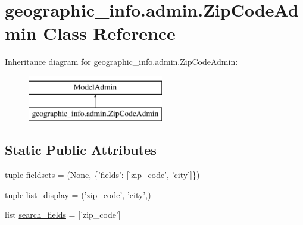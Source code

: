 \hypertarget{classgeographic__info_1_1admin_1_1_zip_code_admin}{\section{geographic\-\_\-info.\-admin.\-Zip\-Code\-Admin Class Reference}
\label{classgeographic__info_1_1admin_1_1_zip_code_admin}
}
Inheritance diagram for geographic\-\_\-info.\-admin.\-Zip\-Code\-Admin\-:\begin{figure}[H]
\begin{center}
\leavevmode
\includegraphics[height=2.000000cm]{classgeographic__info_1_1admin_1_1_zip_code_admin}
\end{center}
\end{figure}
\subsection*{Static Public Attributes}
\begin{DoxyCompactItemize}
\item 
tuple \hyperlink{classgeographic__info_1_1admin_1_1_zip_code_admin_a7c74489d407328fbeee94f16c0e9a9f1}{fieldsets} = (None, \{'fields'\-: \mbox{[}'zip\-\_\-code', 'city'\mbox{]}\})
\item 
tuple \hyperlink{classgeographic__info_1_1admin_1_1_zip_code_admin_aed777acb8e5cf3b458062c810c9b95b5}{list\-\_\-display} = ('zip\-\_\-code', 'city',)
\item 
list \hyperlink{classgeographic__info_1_1admin_1_1_zip_code_admin_aaa56de48f74660c1e1aa81c510458e64}{search\-\_\-fields} = \mbox{[}'zip\-\_\-code'\mbox{]}
\end{DoxyCompactItemize}


